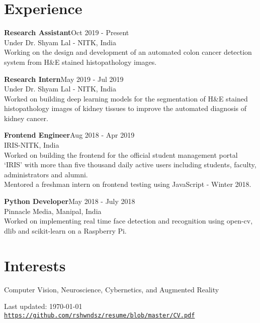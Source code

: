 \documentclass[letterpaper]{article}
\def\footerlink{https://github.com/rshwndsz/resume/blob/master/CV.pdf}
\renewenvironment{itemize}{
  \begin{list}{}{
    \setlength{\leftmargin}{1.5em}
  }
}{
  \end{list}
}
\begin{document}
\section*{Experience}
  \begin{itemize}
    \item \textbf{Research Assistant}\hfill{\textcolor{black!80}{\small{Oct 2019 - Present}}}\\
    \textcolor{black!80}{\small{Under Dr. Shyam Lal - NITK, India}}\\
    Working on the design and development of an automated colon cancer detection system from H\&E stained histopathology images.

    \item \textbf{Research Intern}\hfill{\textcolor{black!80}{\small{May 2019 - Jul 2019}}}\\
    \textcolor{black!80}{\small{Under Dr. Shyam Lal - NITK, India}}\\
    Worked on building deep learning models for the segmentation of H\&E stained histopathology images of kidney tissues to improve the automated diagnosis of kidney cancer.

    \item \textbf{Frontend Engineer}\hfill{\textcolor{black!80}{\small{Aug 2018 - Apr 2019}}}\\
    \textcolor{black!80}{\small{IRIS-NITK, India}}\\
    Worked on building the frontend for the official student management portal `IRIS' with more than five thousand daily active users including students, faculty, administrators and alumni.\\
    Mentored a freshman intern on frontend testing using JavaScript - Winter 2018.

    \item \textbf{Python Developer}\hfill{\textcolor{black!80}{\small{May 2018 - July 2018}}}\\
    \textcolor{black!80}{\small{Pinnacle Media, Manipal, India}}\\
    Worked on implementing real time face detection and recognition using open-cv, dlib and scikit-learn on a Raspberry Pi.
  \end{itemize}


\section*{Interests}
  \begin{itemize}
    \item Computer Vision, Neuroscience, Cybernetics, and Augmented Reality
  \end{itemize}


\bigskip
\begin{center}
  \begin{footnotesize}
    Last updated: \today \\
    \href{\footerlink}{\texttt{\footerlink}}
  \end{footnotesize}
\end{center}
\end{document}

